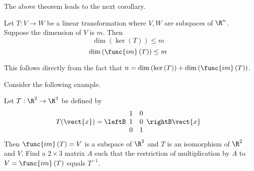The above theorem leads to the next corollary.

\begin{corollary}{}{}
Let $T:V\rightarrow W$ be a linear transformation where $V,W$ are subspaces of $\R^n$. Suppose the dimension of $V$ is $m$. Then 
\[
\dim \left( \ker \left( T\right) \right) \leq m
\]
\[
\dim \left( \func{im}\left( T \right) \right) \leq m
\]
\end{corollary}

This follows directly from the fact that $n=\dim \left( \ker \left( T\right) \right) +\dim \left( \func{im}\left(
T\right) \right) $.

Consider the following example.

\begin{example}{}{}
Let $T:\R^{2}\rightarrow \R^{3}$ be defined by 
\begin{equation*}
T(\vect{x})=\leftB
\begin{array}{rr}
1 & 0 \\ 
1 & 0 \\ 
0 & 1
\end{array}
\rightB \vect{x}
\end{equation*}
Then $\func{im}\left( T\right) =V$ is a subspace of $\R^{3}$ and $T$
is an isomorphism of $\R^{2}$ and $V$. Find a $2\times 3$ matrix $A$
such that the restriction of multiplication by $A$ to $V=\func{im}\left(
T\right) $ equals $T^{-1}$. 
\end{example}

